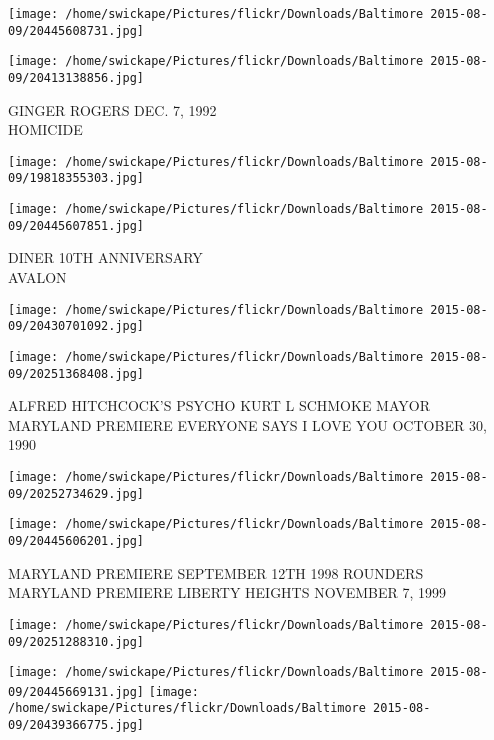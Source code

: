 \documentclass[10pt,letterpaper]{article}
\begin{document}
\texttt{[image: /home/swickape/Pictures/flickr/Downloads/Baltimore 2015-08-09/20445608731.jpg]}

\vspace{0.25in}
\texttt{[image: /home/swickape/Pictures/flickr/Downloads/Baltimore 2015-08-09/20413138856.jpg]}

GINGER ROGERS DEC. 7, 1992\\
HOMICIDE
\pagebreak

\texttt{[image: /home/swickape/Pictures/flickr/Downloads/Baltimore 2015-08-09/19818355303.jpg]}

\vspace{0.25in}
\texttt{[image: /home/swickape/Pictures/flickr/Downloads/Baltimore 2015-08-09/20445607851.jpg]}

DINER 10TH ANNIVERSARY\\
AVALON
\pagebreak

\texttt{[image: /home/swickape/Pictures/flickr/Downloads/Baltimore 2015-08-09/20430701092.jpg]}

\vspace{0.25in}
\texttt{[image: /home/swickape/Pictures/flickr/Downloads/Baltimore 2015-08-09/20251368408.jpg]}

ALFRED HITCHCOCK'S PSYCHO KURT L SCHMOKE MAYOR\\
MARYLAND PREMIERE EVERYONE SAYS I LOVE YOU OCTOBER 30, 1990
\pagebreak

\texttt{[image: /home/swickape/Pictures/flickr/Downloads/Baltimore 2015-08-09/20252734629.jpg]}

\vspace{0.25in}
\texttt{[image: /home/swickape/Pictures/flickr/Downloads/Baltimore 2015-08-09/20445606201.jpg]}

MARYLAND PREMIERE SEPTEMBER 12TH 1998 ROUNDERS\\
MARYLAND PREMIERE LIBERTY HEIGHTS NOVEMBER 7, 1999
\pagebreak

\texttt{[image: /home/swickape/Pictures/flickr/Downloads/Baltimore 2015-08-09/20251288310.jpg]}

\vspace{0.25in}
\texttt{[image: /home/swickape/Pictures/flickr/Downloads/Baltimore 2015-08-09/20445669131.jpg]}
\texttt{[image: /home/swickape/Pictures/flickr/Downloads/Baltimore 2015-08-09/20439366775.jpg]}
\end{document}
